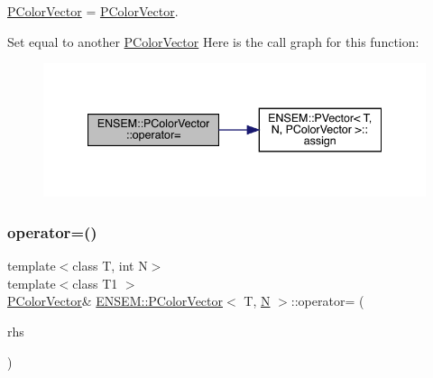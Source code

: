 \mbox{\hyperlink{classENSEM_1_1PColorVector}{P\+Color\+Vector}} = \mbox{\hyperlink{classENSEM_1_1PColorVector}{P\+Color\+Vector}}. 

Set equal to another \mbox{\hyperlink{classENSEM_1_1PColorVector}{P\+Color\+Vector}} Here is the call graph for this function\+:
\nopagebreak
\begin{figure}[H]
\begin{center}
\leavevmode
\includegraphics[width=340pt]{de/dfe/classENSEM_1_1PColorVector_ac5919a92dade0bb7763353ed7d05b8b2_cgraph}
\end{center}
\end{figure}
\mbox{\label{classENSEM_1_1PColorVector_ac5919a92dade0bb7763353ed7d05b8b2}} 
\subsubsection{\texorpdfstring{operator=()}{operator=()}\hspace{0.1cm}{\footnotesize\ttfamily [2/3]}}
{\footnotesize\ttfamily template$<$class T, int N$>$ \\
template$<$class T1 $>$ \\
\mbox{\hyperlink{classENSEM_1_1PColorVector}{P\+Color\+Vector}}\& \mbox{\hyperlink{classENSEM_1_1PColorVector}{E\+N\+S\+E\+M\+::\+P\+Color\+Vector}}$<$ T, \mbox{\hyperlink{adat__devel_2lib_2hadron_2operator__name__util_8cc_a7722c8ecbb62d99aee7ce68b1752f337}{N}} $>$\+::operator= (\begin{DoxyParamCaption}\item[{const \mbox{\hyperlink{classENSEM_1_1PColorVector}{P\+Color\+Vector}}$<$ T1, \mbox{\hyperlink{adat__devel_2lib_2hadron_2operator__name__util_8cc_a7722c8ecbb62d99aee7ce68b1752f337}{N}} $>$ \&}]{rhs }\end{DoxyParamCaption})\hspace{0.3cm}{\ttfamily [inline]}}



